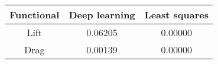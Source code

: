 \begin{tabular}{|c|c|c|}
\hline
Functional&Deep learning&Least squares\\ 
\hline

Lift & 0.06205 & 0.00000\\ 
\hline
Drag & 0.00139 & 0.00000\\ 
\hline
\end{tabular}

